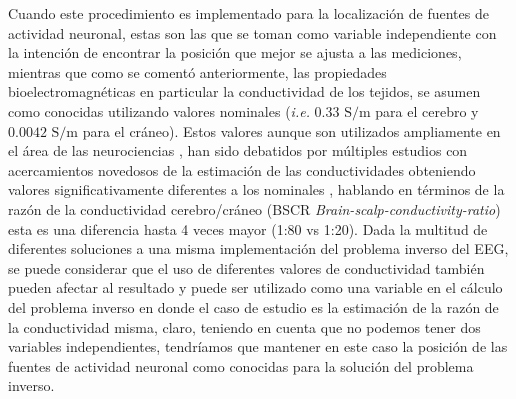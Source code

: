 Cuando este procedimiento es implementado para la localización de fuentes de actividad neuronal, estas son las que se toman como variable independiente con la intención de encontrar la posición que mejor se ajusta a las mediciones, mientras que como se comentó anteriormente, las propiedades bioelectromagnéticas en particular la conductividad de los tejidos, se asumen como conocidas utilizando valores nominales (\emph{i.e.} $0.33\text{ S/m}$ para el cerebro y $0.0042 \text{ S/m}$ para el cráneo). Estos valores aunque son utilizados ampliamente en el área de las neurociencias \cite{Rush1968,Rush1969,Cohen1983}, han sido debatidos por múltiples estudios con acercamientos novedosos de la estimación de las conductividades obteniendo valores significativamente diferentes a los nominales \cite{McCann2019}, hablando en términos de la razón de la conductividad cerebro/cráneo (BSCR \emph{Brain-scalp-conductivity-ratio}) esta es una diferencia hasta 4 veces mayor (1:80 vs 1:20). Dada la multitud de diferentes soluciones a una misma implementación del problema inverso del EEG, se puede considerar que el uso de diferentes valores de conductividad también pueden afectar al resultado y puede ser utilizado como una variable en el cálculo del problema inverso en donde el caso de estudio es la estimación de la razón de la conductividad misma, claro, teniendo en cuenta que no podemos tener dos variables independientes, tendríamos que mantener en este caso la posición de las fuentes de actividad neuronal como conocidas para la solución del problema inverso. 








